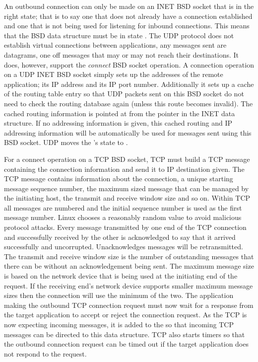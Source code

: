 An outbound connection can only be made on an INET BSD socket that is in the right state; that is to say
one that  does not already have a connection established and one that is not being used for listening
for inbound connections.
This means that the BSD  data structure must be in state .
The UDP protocol does not establish virtual connections between applications, any messages sent
are datagrams, one off messages that may or may not reach their destinations.
It does, however, support the {\em connect} BSD socket operation.
A connection operation on a UDP INET BSD socket simply sets up the addresses of the remote application;
its IP address and its IP port number.
Additionally it sets up a cache of the routing table entry so that UDP packets sent on this BSD socket
do not need to check the routing database again (unless this route becomes invalid).
The cached routing information is pointed at from the  pointer in the 
INET  data structure.
If no addressing information is given, this cached routing and IP addressing information will be 
automatically be used for messages sent using this BSD socket.
UDP moves the 's state to .

For a connect operation on a TCP BSD socket, TCP must build a TCP message containing the connection
information and send it to IP destination given.
The TCP message contains information about the connection, a unique starting message sequence number,
the maximum sized message that can be managed by the initiating host, the transmit and receive window
size and so on.
Within TCP all messages are numbered and the initial sequence number is used as the first message
number.
Linux chooses a reasonably random value to avoid malicious protocol attacks.
Every message transmitted by one end of the TCP connection and successfully received by the other is 
acknowledged to say that it arrived successfully and uncorrupted.
Unacknowledges messages will be retransmitted.
The transmit and receive window size is the number of outstanding messages that there can be without an
acknowledgement being sent.
The maximum message size is based on the network device that is being used at the initiating end of the 
request.
If the receiving end's network device supports smaller maximum message sizes then the connection will 
use the minimum of the two.
The application making the outbound TCP connection request must now wait for a response from the 
target application to accept or reject the connection request.
As the TCP  is now expecting incoming messages, it is added to the 
so that incoming TCP messages can be directed to this  data structure.
TCP also starts timers so that the outbound connection request can be timed out if the target application
does not respond to the request.

